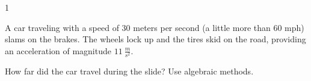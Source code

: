 
\AddToShipoutPicture*{\BackgroundPic}

\addtocounter {ProbNum} {1}

 
{\bf \Large{}} A car traveling with a speed of 30 meters per second (a little more than 60 mph) slams on the brakes.  The wheels lock up and the tires skid on the road, providing an acceleration of magnitude ${11~\tfrac{m}{s^2}}$.   \bigskip

How far did the car travel during the slide? Use algebraic methods.\paragraph{}
\noindent
\vfill




\newpage